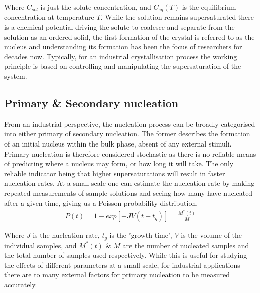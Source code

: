 Where $C_{sol}$ is just the solute concentration, and 
$C_{eq}(T)$ is the equilibrium concentration at temperature 
$T$. While the solution remains supersaturated there 
is a chemical potential driving the solute to coalesce 
and separate from the solution as an ordered solid, the 
first formation of the crystal is referred to as the 
nucleus and understanding its formation has been the 
focus of researchers for decades now. Typically, for an 
industrial crystallisation process the working principle 
is based on controlling and manipulating the supersaturation 
of the system. 

\subsection{Primary \& Secondary nucleation}
From an industrial perspective, the nucleation process can 
be broadly categorised into either primary of secondary
nucleation. The former describes the formation of an initial
nucleus within the bulk phase, absent of any external stimuli.
Primary nucleation is therefore considered stochastic as there 
is no reliable means of predicting where a nucleus may form, 
or how long it will take. The only reliable indicator being 
that higher supersaturations will result in faster nucleation
rates. At a small scale one can estimate the nucleation rate 
by making repeated measurements of sample solutions and seeing
how many have nucleated after a given time, giving us a Poisson
probability distribution.
\begin{align}
	P(t) = 1 - exp\left[-JV(t-t_g)\right] = \frac{M^*(t)}{M}
\end{align}

Where $J$ is the nucleation rate, $t_g$ is the 'growth time', 
$V$ is the volume of the individual samples, and $M^*(t)$ \& 
$M$ are the number of nucleated samples and the total number 
of samples used respectively. While this is useful for studying
the effects of different parameters at a small scale, for
industrial applications there are to many external factors 
for primary nucleation to be measured accurately. 

